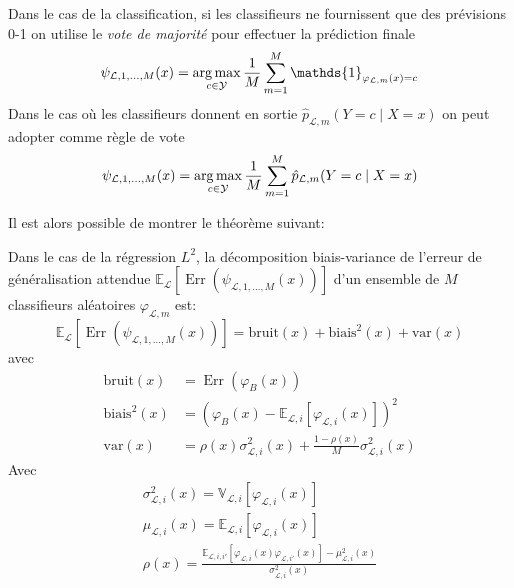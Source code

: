 Dans le cas de la classification, si les classifieurs ne fournissent que des prévisions 0-1 on utilise le \emph{vote de majorité} pour effectuer la prédiction finale
\begin{equation*}
     \psi_{\mathcal{L},1,\dotsc,M} (x) = \argmax_{c \in \mathcal{Y}} \frac{1}{M} \sum_{m=1}^M \mathds{1}_{\varphi_{\mathcal{L},m} (x) = c}
\end{equation*}
Dans le cas où les classifieurs donnent en sortie $\hat{p}_{\mathcal{L},m} ( Y = c \mid X = x)$ on peut adopter comme règle de vote
\begin{equation*}
     \psi_{\mathcal{L},1,\dotsc,M} (x) = \operatorname*{arg\,max}_{c \in \mathcal{Y}} \frac{1}{M} \sum_{m=1}^M \hat{p}_{\mathcal{L},m} ( Y = c \mid X = x)
\end{equation*}


Il est alors possible de montrer le théorème suivant:
\begin{theoreme}
        Dans le cas de la régression $L^2$, la décomposition biais-variance de l'erreur de généralisation attendue $\mathbb{E}_{\mathcal{L}} \left[ \operatorname{Err} \left( \psi_{\mathcal{L},1,\dotsc,M} (x) \right) \right] $ d'un ensemble de $M$ classifieurs aléatoires $\varphi_{\mathcal{L},m}$ est:
        \begin{equation*}
            \mathbb{E}_{\mathcal{L}} \left[ \operatorname{Err}(\psi_{\mathcal{L},1,\dotsc,M} (x)) \right] = \mathrm{bruit}(x) + \mathrm{biais}^2 (x) + \mathrm{var} (x)
        \end{equation*}
        avec
        \begin{align*}
            \mathrm{bruit}(x) &= \operatorname{Err} ( \varphi_B (x) ) \\
            \mathrm{biais}^2 (x) &= \left( \varphi_B (x) - \mathbb{E}_{\mathcal{L},i} \left[ \varphi_{\mathcal{L},i} (x) \right] \right)^2 \\
            \mathrm{var} (x) &= \rho (x) \sigma^2_{\mathcal{L},i} (x) + \frac{1-\rho (x)}{M} \sigma^2_{\mathcal{L},i} (x) 
        \end{align*}
        Avec
        \begin{gather*}
            \sigma^2_{\mathcal{L},i} (x) = \mathbb{V}_{\mathcal{L},i} [ \varphi_{\mathcal{L},i} (x)] \\
            \mu_{\mathcal{L},i} (x) = \mathbb{E}_{\mathcal{L},i} [ \varphi_{\mathcal{L},i} (x)] \\
            \rho (x) = \frac{\mathbb{E}_{\mathcal{L},i,i'} [ \varphi_{\mathcal{L},i} (x) \varphi_{\mathcal{L},i'} (x)] - \mu^2_{\mathcal{L},i} (x) }{\sigma^2_{\mathcal{L},i} (x)}
        \end{gather*}
\end{theoreme}

